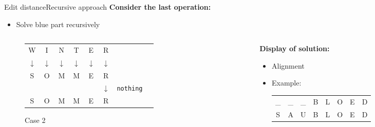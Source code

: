 \begin{frame}{Edit distance}{Recursive approach}
  \textbf{Consider the last operation:}
  \begin{itemize}
    \item
      Solve {\color{MainA}blue} part recursively
  \end{itemize}
  \begin{columns}
    \begin{column}{0.3\linewidth}
      \begin{figure}[!h]
        \begin{center}
          \begin{tabular}{c@{}c@{}c@{}c@{}c@{}c@{}c@{}l}
            \color{MainA}W & \color{MainA}I & \color{MainA}N &
            \color{MainA}T & \color{MainA}E & \color{MainA}R\\
            \color{MainA}$\downarrow$ & \color{MainA}$\downarrow$ &
            \color{MainA}$\downarrow$ & \color{MainA}$\downarrow$ &
            \color{MainA}$\downarrow$ & \color{MainA}$\downarrow$\\
            \color{MainA}S & \color{MainA}O & \color{MainA}M &
            \color{MainA}M & \color{MainA}E & \color{MainA}R\\
            {} & {} & {} & {} & {} & $\downarrow$ & \texttt{nothing}\\
            S & O & M & M & E & R
          \end{tabular}
        \end{center}
        \caption{Case 2}
      \end{figure}
    \end{column}
    \begin{column}{0.5\linewidth}
      \textbf{Display of solution:}
      \begin{itemize}
        \item
          Alignment
        \item
          Example:
          \begin{tabular}{cccccccc}
            \_ & \_ & \_ & B & L & O & E & D\\
            S & A & U & B & L & O & E & D
          \end{tabular}
      \end{itemize}
    \end{column}
  \end{columns}
\end{frame}


